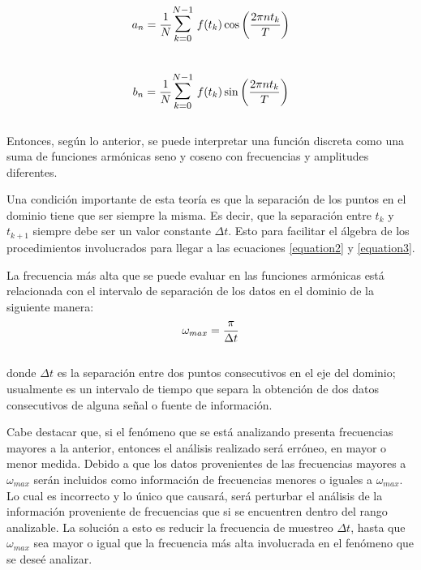 \begin{equation}\label{equation2}
a_{n}={1\over N}\mathlarger{\mathlarger{\sum}}_{k=0}^{N-1}\ f(t_{k})\cos{\left( 2\pi nt_{k}\over T\right) }
\end{equation}\\

\begin{equation}\label{equation3}
b_{n}={1\over N}\mathlarger{\mathlarger{\sum}}_{k=0}^{N-1}\ f(t_{k})\sin{\left( 2\pi nt_{k}\over T\right) }
\end{equation}\\



Entonces, según lo anterior, se puede interpretar una función discreta como una suma de funciones armónicas seno y coseno con frecuencias y amplitudes diferentes.

Una condición importante de esta teoría es que la separación de los puntos en el dominio tiene que ser siempre la misma. 
Es decir, que la separación entre $t_k$ y $t_{k+1}$ siempre debe ser un valor constante $\Delta t$.
Esto para facilitar el álgebra de los procedimientos involucrados para llegar a las ecuaciones \ref{equation2} y \ref{equation3}.

La frecuencia más alta que se puede evaluar en las funciones armónicas está relacionada con el intervalo de separación de los datos en el dominio de la siguiente manera:\\

$$\omega_{max}={\pi \over \Delta t}$$\\

\noindent donde $\Delta t$ es la separación entre dos puntos consecutivos en el eje del dominio; usualmente es un intervalo de tiempo que separa la obtención de dos datos consecutivos de alguna señal o fuente de información.

Cabe destacar que, si el fenómeno que se está analizando presenta frecuencias mayores a la anterior, entonces el análisis realizado será erróneo, en mayor o menor medida. 
Debido a que los datos provenientes de las frecuencias mayores a $\omega_{max}$ serán incluidos como información de frecuencias menores o iguales a $\omega_{max}$. 
Lo cual es incorrecto y lo único que causará, será perturbar el análisis de la información proveniente de frecuencias que si se encuentren dentro del rango analizable. 
La solución a esto es reducir la frecuencia de muestreo $\Delta t$, hasta que $\omega_{max}$ sea mayor o igual que la frecuencia más alta involucrada en el fenómeno que se deseé analizar.

